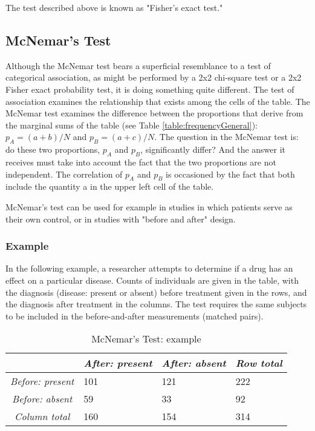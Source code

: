 The test described above is known as "Fisher's exact test."


\subsection{McNemar's Test}

Although the McNemar test bears a superficial resemblance to a test of categorical association, as might be performed by a 2x2 chi-square test or a 2x2 Fisher exact probability test, it is doing something quite different. The test of association examines the relationship that exists among the cells of the table. The McNemar test examines the difference between the proportions that derive from the marginal sums of the table (see Table \ref{table:frequencyGeneral}): $p_A=(a+b)/N$ and $p_B=(a+c)/N$. The question in the McNemar test is: do these two proportions, $p_A$ and $p_B$, significantly differ? And the answer it receives must take into account the fact that the two proportions are not independent. The correlation of $p_A$ and $p_B$ is occasioned by the fact that both include the quantity a in the upper left cell of the table.

McNemar's test can be used for example in studies in which patients serve as their own control, or in studies with "before and after" design.

\subsubsection{Example}

In the following example, a researcher attempts to determine if a drug has an effect on a particular disease. Counts of individuals are given in the table, with the diagnosis (disease: present or absent) before treatment given in the rows, and the diagnosis after treatment in the columns. The test requires the same subjects to be included in the before-and-after measurements (matched pairs).

\begin{table}
  \centering
  \begin{tabular}{|c|l l l|}
  \hline
  & \emph{After: present} & \emph{After: absent} & \emph{Row total} \\
  \hline
  \emph{Before: present} & 101 & 121 & 222 \\
  \emph{Before: absent} & 59 & 33 & 92 \\
  \emph{Column total} & 160 & 154 & 314 \\
  \hline
  \end{tabular}

  \caption{McNemar's Test: example}\label{table:McNemarExample}
\end{table}


